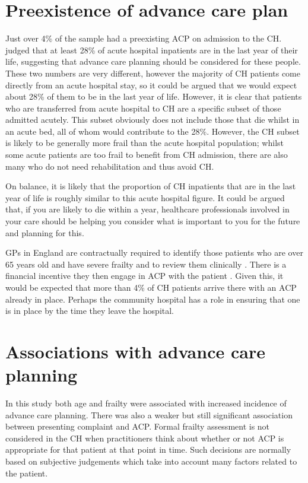\documentclass
[
	12pt,
	a4paper,
	oneside,
]{report}
\begin{document}
\section{Preexistence of advance care plan}

Just over 4\% of the sample had a preexisting ACP on admission to the CH. 
\textcite{clarke:14} judged that at least 28\% of acute hospital 
inpatients are in the last year of their life, suggesting that advance care 
planning should be considered for these people. 
These two numbers are very different, however the majority of CH patients 
come directly from an acute hospital
stay, so it could be argued that we would expect about 28\% of them to be in
the last year of life. However, it is clear that patients who are transferred 
from acute hospital to CH are a specific subset of those admitted acutely.
This subset obviously does not include those that die whilst in an acute bed,
all of whom would contribute to the 28\%.  However, the CH subset is likely 
to be generally more frail than the acute hospital population; whilst some
acute patients are too frail to benefit from CH admission, there are also many 
who do not need rehabilitation and thus avoid CH.

On balance, it is likely that the proportion of CH inpatients that are in the
last year of life is roughly similar to this acute hospital figure. It
could be argued that, if you are likely to die within a year, healthcare
professionals involved in your care should be helping you consider what
is important to you for the future and planning for this. 


GPs in England are contractually required to identify those patients who are 
over 65 years old and have severe frailty and to review them clinically
\parencite{nhse:17}. There is a financial incentive they then
engage in ACP with the patient \parencite{hunt:16}. Given
this, it would be expected that more than 4\% of CH patients arrive there
with an ACP already in place. Perhaps the community hospital has a role in
ensuring that one is in place by the time they leave the hospital.

\section{Associations with advance care planning}

In this study both age and frailty were associated with increased incidence of
advance care planning. There was also a weaker but still significant association
between presenting complaint and ACP. Formal frailty assessment is not 
considered in the CH when practitioners think about whether or not ACP is 
appropriate for that patient at that point in time. Such decisions are normally
based on subjective judgements which take into account many factors related to
the patient.
\end{document}
